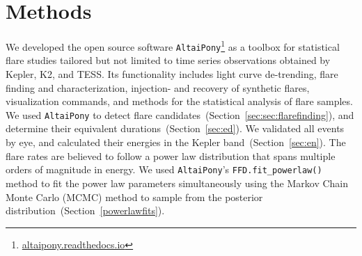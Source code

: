 \documentclass{aa}
\begin{document}
\section{Methods}
\label{sec:methods}
We developed the open source software \texttt{AltaiPony}\footnote{\url{altaipony.readthedocs.io}} as a toolbox for statistical flare studies tailored but not limited to time series observations obtained by Kepler, K2, and TESS. Its functionality includes light curve de-trending, flare finding and characterization, injection- and recovery of synthetic flares, visualization commands, and methods for the statistical analysis of flare samples. We used \texttt{AltaiPony} to detect flare candidates~(Section~\ref{sec:sec:flarefinding}), and determine their equivalent durations~(Section~\ref{sec:ed}). We validated all events by eye, and calculated their energies in the Kepler band~(Section~\ref{sec:en}). The flare rates are believed to follow a power law distribution that spans multiple orders of magnitude in energy. We used \texttt{AltaiPony}'s \texttt{FFD.fit\_powerlaw()} method to fit the power law parameters simultaneously using the Markov Chain Monte Carlo (MCMC) method to sample from the posterior distribution~(Section~\ref{powerlawfits}).
\end{document}
